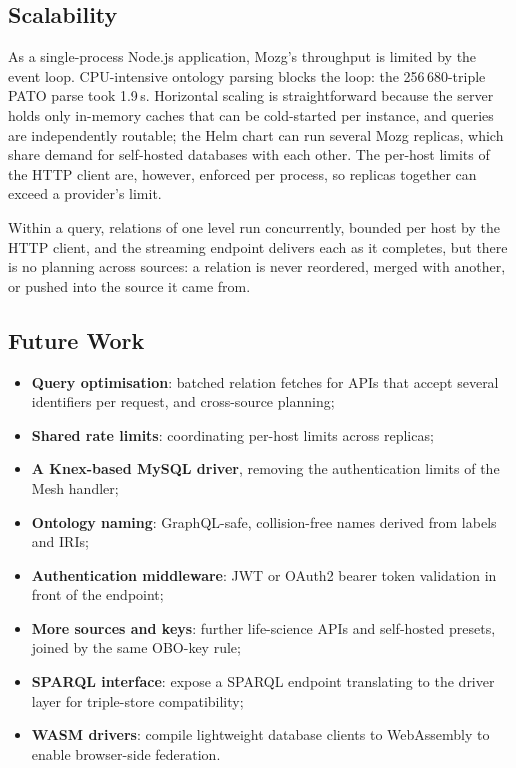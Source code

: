\documentclass[sigconf,nonacm]{acmart}
\begin{document}
\subsection{Scalability}

As a single-process Node.js application, Mozg's throughput is limited
by the event loop.  CPU-intensive ontology parsing blocks the loop:
the 256\,680-triple PATO parse took 1.9\,s.  Horizontal scaling is
straightforward because the server holds only in-memory caches that
can be cold-started per instance, and queries are independently
routable; the Helm chart can run several Mozg replicas, which share
demand for self-hosted databases with each other.  The per-host limits
of the HTTP client are, however, enforced per process, so replicas
together can exceed a provider's limit.

Within a query, relations of one level run concurrently, bounded per
host by the HTTP client, and the streaming endpoint delivers each as it
completes, but there is no
planning across sources: a relation is never reordered, merged with
another, or pushed into the source it came from.

\subsection{Future Work}

\begin{itemize}
  \item \textbf{Query optimisation}: batched relation fetches for APIs
        that accept several identifiers per request, and cross-source
        planning;
  \item \textbf{Shared rate limits}: coordinating per-host limits
        across replicas;
  \item \textbf{A Knex-based MySQL driver}, removing the
        authentication limits of the Mesh handler;
  \item \textbf{Ontology naming}: GraphQL-safe, collision-free names
        derived from labels and IRIs;
  \item \textbf{Authentication middleware}: JWT or OAuth2 bearer
        token validation in front of the endpoint;
  \item \textbf{More sources and keys}: further life-science APIs and
        self-hosted presets, joined by the same OBO-key rule;
  \item \textbf{SPARQL interface}: expose a SPARQL endpoint
        translating to the driver layer for triple-store
        compatibility;
  \item \textbf{WASM drivers}: compile lightweight database clients
        to WebAssembly to enable browser-side federation.
\end{itemize}
\end{document}
